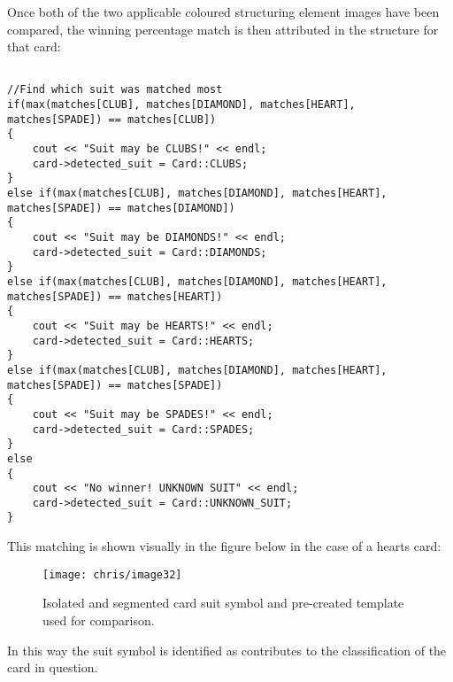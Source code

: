 		Once both of the two applicable coloured structuring element images have been compared, the winning percentage match is then attributed in the structure for that card:

		\begin{lstlisting}

//Find which suit was matched most
if(max(matches[CLUB], matches[DIAMOND], matches[HEART], matches[SPADE]) == matches[CLUB])
{
	cout << "Suit may be CLUBS!" << endl;
	card->detected_suit = Card::CLUBS;  
}
else if(max(matches[CLUB], matches[DIAMOND], matches[HEART], matches[SPADE]) == matches[DIAMOND])
{
	cout << "Suit may be DIAMONDS!" << endl;
	card->detected_suit = Card::DIAMONDS;
}
else if(max(matches[CLUB], matches[DIAMOND], matches[HEART], matches[SPADE]) == matches[HEART])
{
	cout << "Suit may be HEARTS!" << endl;
	card->detected_suit = Card::HEARTS;
}
else if(max(matches[CLUB], matches[DIAMOND], matches[HEART], matches[SPADE]) == matches[SPADE])
{
	cout << "Suit may be SPADES!" << endl;
	card->detected_suit = Card::SPADES;
}
else
{
	cout << "No winner! UNKNOWN SUIT" << endl;
	card->detected_suit = Card::UNKNOWN_SUIT;
}
		\end{lstlisting}

		This matching is shown visually in the figure below in the case of a hearts card:

		\begin{figure}[H]
			\centering
			\texttt{[image: chris/image32]}
			\caption{Isolated and segmented card suit symbol and pre-created template used for comparison.}
		\end{figure}

		In this way the suit symbol is identified as contributes to the classification of the card in question.